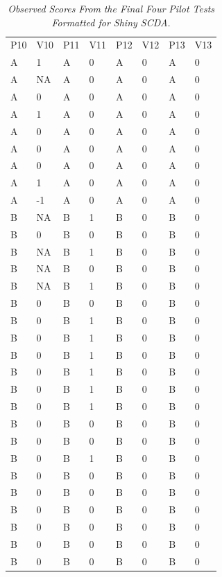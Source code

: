 \documentclass{article}
\begin{document}
\begin{table}

  \caption{\emph{Observed }\emph{Scores }\emph{From} \emph{the Final Four} \emph{Pilot Tests Formatted for Shiny SCDA.} }
\label{Table 3}

\begin{tabular}{l  l  l  l  l  l  l  l}

  P10 & V10 & P11 & V11 & P12 & V12 & P13 & V13\\
A & 1 & A & 0 & A & 0 & A & 0\\
A & NA & A & 0 & A & 0 & A & 0\\
A & 0 & A & 0 & A & 0 & A & 0\\
A & 1 & A & 0 & A & 0 & A & 0\\
A & 0 & A & 0 & A & 0 & A & 0\\
A & 0 & A & 0 & A & 0 & A & 0\\
A & 0 & A & 0 & A & 0 & A & 0\\
A & 1 & A & 0 & A & 0 & A & 0\\
A & -1 & A & 0 & A & 0 & A & 0\\
B & NA & B & 1 & B & 0 & B & 0\\
B & 0 & B & 0 & B & 0 & B & 0\\
B & NA & B & 1 & B & 0 & B & 0\\
B & NA & B & 0 & B & 0 & B & 0\\
B & NA & B & 1 & B & 0 & B & 0\\
B & 0 & B & 0 & B & 0 & B & 0\\
B & 0 & B & 1 & B & 0 & B & 0\\
B & 0 & B & 1 & B & 0 & B & 0\\
B & 0 & B & 1 & B & 0 & B & 0\\
B & 0 & B & 1 & B & 0 & B & 0\\
B & 0 & B & 1 & B & 0 & B & 0\\
B & 0 & B & 1 & B & 0 & B & 0\\
B & 0 & B & 0 & B & 0 & B & 0\\
B & 0 & B & 0 & B & 0 & B & 0\\
B & 0 & B & 1 & B & 0 & B & 0\\
B & 0 & B & 0 & B & 0 & B & 0\\
B & 0 & B & 0 & B & 0 & B & 0\\
B & 0 & B & 0 & B & 0 & B & 0\\
B & 0 & B & 0 & B & 0 & B & 0\\
B & 0 & B & 0 & B & 0 & B & 0\\
B & 0 & B & 0 & B & 0 & B & 0\\


\end{tabular}
 

\end{table}
\end{document}
